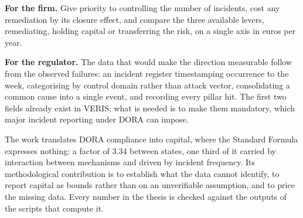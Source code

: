 \textbf{For the firm.} Give priority to controlling the number of incidents, cost any remediation by
its closure effect, and compare the three available levers, remediating, holding capital or
transferring the risk, on a single axis in euros per year.

\textbf{For the regulator.} The data that would make the direction measurable follow from the
observed failures: an incident register timestamping occurrence to the week, categorising by
control domain rather than attack vector, consolidating a common cause into a single event, and
recording every pillar hit. The
first two fields already exist in VERIS; what is needed is to make them mandatory, which major
incident reporting under DORA can impose.

The work translates DORA compliance into capital, where the Standard Formula expresses nothing: a
factor of $3.34$ between states, one third of it carried by interaction between mechanisms and
driven by incident frequency. Its methodological contribution is to establish what the data cannot
identify, to report capital as bounds rather than on an unverifiable assumption, and to price the
missing data. Every number in the thesis is checked against the outputs of the scripts that
compute it.
